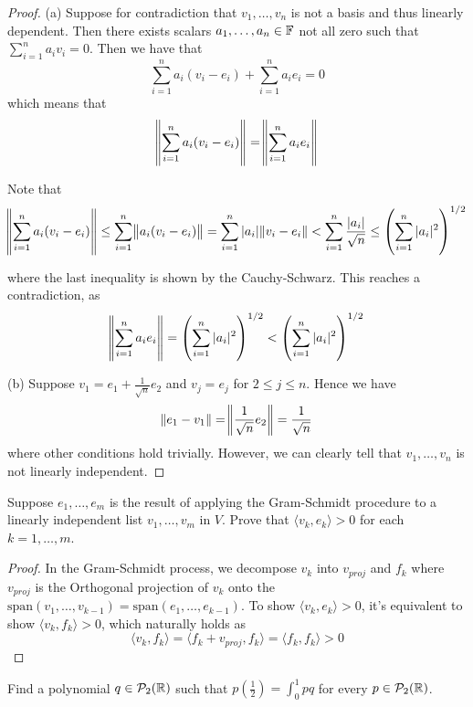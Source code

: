 \documentclass{extarticle}
\begin{document}
\begin{proof}
(a) Suppose for contradiction that \(v_1, \ldots, v_n\) is not a basis and thus linearly dependent. 
Then there exists scalars \(a_1, \ldots, a_n \in \mathbb{F}\) not all zero such that \(\sum_{i=1}^{n}a_iv_i = 0\). 
Then we have that 
\[\sum_{i=1}^{n} a_i (v_i - e_i) +  \sum_{i=1}^{n} a_i e_i = 0\]
which means that 
\[\norm{\sum_{i=1}^{n} a_i (v_i - e_i)} = \norm{\sum_{i=1}^{n} a_i e_i}\]

Note that 
\[\norm{\sum_{i=1}^{n} a_i (v_i - e_i)} \leq \sum_{i=1}^{n} \norm{a_i (v_i - e_i)} 
= \sum_{i=1}^{n} |a_i| \norm{v_i - e_i} < \sum_{i=1}^{n} \frac{|a_i|}{\sqrt{n}} \leq \left(\sum_{i=1}^{n} |a_i|^2\right)^{1/2}\]

where the last inequality is shown by the Cauchy-Schwarz. This reaches a contradiction, as 
\[\norm{\sum_{i=1}^{n} a_i e_i} = \left(\sum_{i=1}^{n} |a_i|^2 \right)^{1/2} < \left(\sum_{i=1}^{n} |a_i|^2 \right)^{1/2}\]

(b) Suppose \(v_1 = e_1 + \frac{1}{\sqrt{n}}e_2\) and \(v_j = e_j\) for \(2 \leq j \leq n\). Hence we have 
\[\norm{e_1 - v_1} = \norm{\frac{1}{\sqrt{n}} e_2} = \frac{1}{\sqrt{n}}\]
where other conditions hold trivially. However, we can clearly tell that \(v_1, \ldots, v_n\) is not 
linearly independent. 
\end{proof}

\begin{problem}{9}
    Suppose \(e_1, \ldots, e_m\) is the result of applying the Gram-Schmidt procedure to a linearly 
    independent list \(v_1, \ldots, v_m\) in \(V\). Prove that \(\langle v_k,e_k \rangle > 0\) for 
    each \(k = 1, \ldots, m\).
\end{problem}

\begin{proof}
In the Gram-Schmidt process, we decompose \(v_k\) into \(v_{proj}\) and \(f_k\) where \(v_{proj}\) is 
the Orthogonal projection of \(v_k\) onto the \(\text{span}(v_1, \ldots, v_{k-1}) = \text{span}(e_1, \ldots, e_{k-1})\). 
To show \(\langle v_k,e_k \rangle > 0\), it's equivalent to show \(\langle v_k, f_k \rangle > 0\), which 
naturally holds as 
\[\langle v_k,f_k \rangle = \langle f_k + v_{proj},f_k \rangle = \langle f_k,f_k \rangle > 0\]
\end{proof}

\begin{problem}{11}
    Find a polynomial \(q \in \mathcal{P}_2(\mathbb{R})\) such that \(p(\frac{1}{2}) = \int_{0}^{1}pq \) for every 
    \(p \in \mathcal{P}_2(\mathbb{R})\).
\end{problem}
\end{document}

